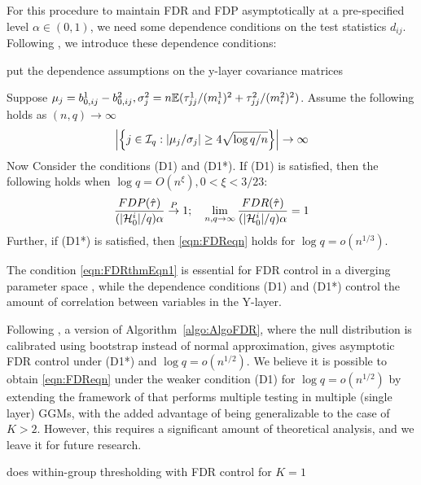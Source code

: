 For this procedure to maintain FDR and FDP asymptotically at a pre-specified level $\alpha \in (0,1)$, we need some dependence conditions on the test statistics $d_{ij}$. Following \cite{LiuShao14}, we introduce these dependence conditions:

 {\colrbf put the dependence assumptions on the y-layer covariance matrices}


\begin{Theorem}\label{thm:FDRthm}
Suppose $\mu_j = b_{0,ij}^1 - b_{0,ij}^2, \sigma_j^2 = n {\mathbb{E}} (\tau_{jj}^1/ (m_i^1)^2 + \tau_{jj}^2/ (m_i^2)^2)$. Assume the following holds as $(n,q) \rightarrow \infty$
%
\begin{align}\label{eqn:FDRthmEqn1}
\left| \left\{ j \in {\cal{I}}_q: |\mu_j / \sigma_j | \geq
4 \sqrt{ \log q/n} \right\} \right| \rightarrow \infty
\end{align}
%
Now Consider the conditions (D1) and (D1*). If (D1) is satisfied, then the following holds when $\log q = O(n^{\xi}), 0 < \xi < 3/23$:
%
\begin{align}\label{eqn:FDReqn}
\frac{FDP( \hat \tau)}{(| {\cal{H}}_0^i|/q) \alpha} \stackrel{P}{\rightarrow} 1; \quad
\lim_{n, q \rightarrow \infty} \frac{FDR( \hat \tau)}{(| {\cal{H}}_0^i|/q) \alpha} = 1
\end{align}
%
Further, if (D1*) is satisfied, then \eqref{eqn:FDReqn} holds for $\log q = o(n^{1/3})$.
\end{Theorem}
%
The condition \eqref{eqn:FDRthmEqn1} is essential for FDR control in a diverging parameter space \citep{LiuShao14, Liu17}, while the dependence conditions (D1) and (D1*) control the amount of correlation between variables in the Y-layer.

\begin{Remark}
Following \cite{LiuShao14}, a version of Algorithm~\ref{algo:AlgoFDR}, where the null distribution is calibrated using bootstrap instead of normal approximation, gives asymptotic FDR control under (D1*) and $\log q = o(n^{1/2})$. We believe it is possible to obtain \eqref{eqn:FDReqn} under the weaker condition (D1) for $ \log q = o(n^{1/2})$ by extending the framework of \cite{Liu17} that performs multiple testing in multiple (single layer) GGMs, with the added advantage of being generalizable to the case of $K > 2$. However, this requires a significant amount of theoretical analysis, and we leave it for future research.
\end{Remark}

\begin{Remark}
{\colrbf does within-group thresholding with FDR control for $K=1$}
\end{Remark}